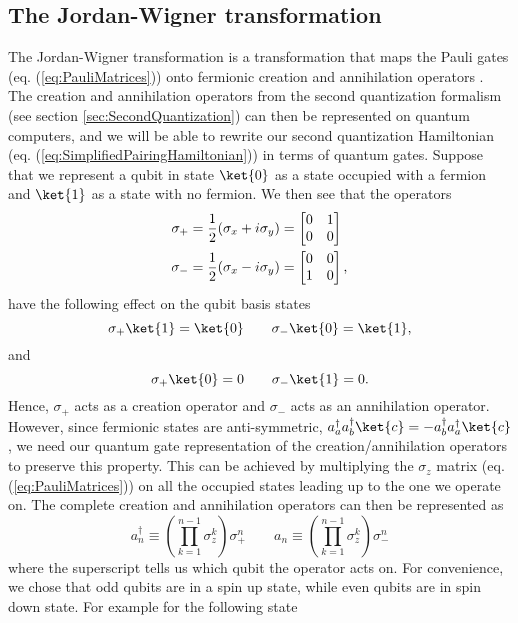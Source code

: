 \subsection{The Jordan-Wigner transformation}
\label{subsec:JordanWignerTransformation}
The Jordan-Wigner transformation is a transformation that maps the Pauli gates (eq. (\ref{eq:PauliMatrices})) onto fermionic creation and annihilation operators \cite{Nielsen2005TheFC}. The creation and annihilation operators from the second quantization formalism (see section \ref{sec:SecondQuantization}) can then be represented on quantum computers, and we will be able to rewrite our second quantization Hamiltonian (eq. (\ref{eq:SimplifiedPairingHamiltonian})) in terms of quantum gates. Suppose that we represent a qubit in state $\ket{0}$ as a state occupied with a fermion and $\ket{1}$ as a state with no fermion. We then see that the operators
\begin{align}
    \label{eq:sigmaplussigmaminus}
    \sigma_+ &= \frac{1}{2}(\sigma_x + i\sigma_y) = \begin{bmatrix}
    0 & 1  \\
    0 & 0
\end{bmatrix} \notag \\
    \sigma_- &= \frac{1}{2}(\sigma_x - i\sigma_y) = \begin{bmatrix}
    0 & 0  \\
    1 & 0
\end{bmatrix},
\end{align}
have the following effect on the qubit basis states
$$\sigma_+ \ket{1} = \ket{0} \qquad \sigma_- \ket{0} = \ket{1},$$
and
$$\sigma_+ \ket{0} = 0 \qquad \sigma_-\ket{1} = 0.$$
Hence, $\sigma_+$ acts as a creation operator and $\sigma_-$ acts as an annihilation operator. However, since fermionic states are anti-symmetric, $a^\dagger_a a^\dagger_b \ket{c} = - a^\dagger_b a^\dagger_a \ket{c}$, we need our quantum gate representation of the creation/annihilation operators to preserve this property. This can be achieved by multiplying the $\sigma_z$ matrix (eq. (\ref{eq:PauliMatrices})) on all the occupied states leading up to the one we operate on. The complete creation and annihilation operators can then be represented as
\begin{equation}
    \label{eq:LadderOpsPauli}
    a^\dagger_n \equiv \left(\prod_{k=1}^{n-1}\sigma_z^k \right)\sigma_+^n \qquad a_n \equiv \left(\prod_{k=1}^{n-1}\sigma_z^k \right) \sigma_-^n
\end{equation}
where the superscript tells us which qubit the operator acts on. For convenience, we chose that odd qubits are in a spin up state, while even qubits are in spin down state. For example for the following state
